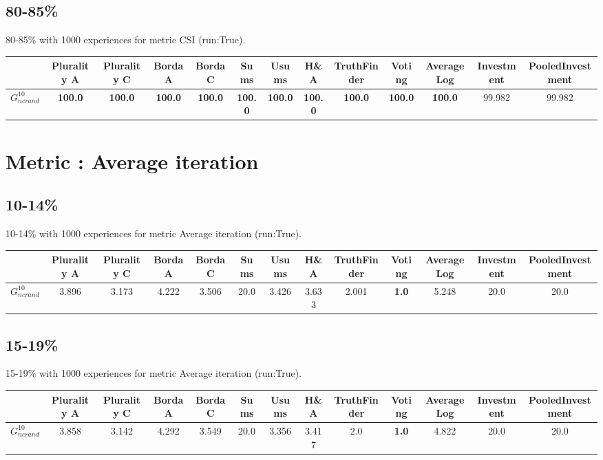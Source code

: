 \documentclass{article}
\newcommand{\graph}[2]{$G_{#1}^{#2}$}
\begin{document}
\subsection{80-85\%}

80-85\% with 1000 experiences for metric CSI (run:True).

\noindent\begin{tabular}{|l|c|c|c|c|c|c|c|c|c|c|c|c|}
\hline
& Plurality A& Plurality C& Borda A& Borda C& Sums& Usums& H\&A& TruthFinder& Voting& AverageLog& Investment& PooledInvestment\\
\hline
\graph{ncrand}{10} &\textbf{100.0}&\textbf{100.0}&\textbf{100.0}&\textbf{100.0}&\textbf{100.0}&\textbf{100.0}&\textbf{100.0}&\textbf{100.0}&\textbf{100.0}&\textbf{100.0}&99.982&99.982\\
\hline
\end{tabular}
\newpage
\newpage
\section{Metric : Average iteration}

\newpage

\subsection{10-14\%}

10-14\% with 1000 experiences for metric Average iteration (run:True).

\noindent\begin{tabular}{|l|c|c|c|c|c|c|c|c|c|c|c|c|}
\hline
& Plurality A& Plurality C& Borda A& Borda C& Sums& Usums& H\&A& TruthFinder& Voting& AverageLog& Investment& PooledInvestment\\
\hline
\graph{ncrand}{10} &3.896&3.173&4.222&3.506&20.0&3.426&3.633&2.001&\textbf{1.0}&5.248&20.0&20.0\\
\hline
\end{tabular}
\newpage

\subsection{15-19\%}

15-19\% with 1000 experiences for metric Average iteration (run:True).

\noindent\begin{tabular}{|l|c|c|c|c|c|c|c|c|c|c|c|c|}
\hline
& Plurality A& Plurality C& Borda A& Borda C& Sums& Usums& H\&A& TruthFinder& Voting& AverageLog& Investment& PooledInvestment\\
\hline
\graph{ncrand}{10} &3.858&3.142&4.292&3.549&20.0&3.356&3.417&2.0&\textbf{1.0}&4.822&20.0&20.0\\
\hline
\end{tabular}
\newpage
\end{document}
